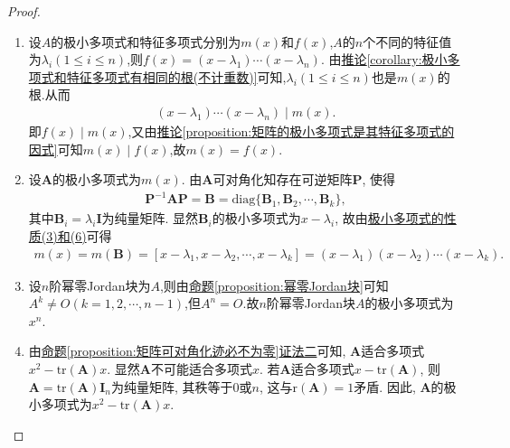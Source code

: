\documentclass[../../main.tex]{subfiles}
\begin{document}
\begin{proof}
\begin{enumerate}[(1)]
\item 设$A$的极小多项式和特征多项式分别为$m(x)$和$f(x)$,$A$的$n$个不同的特征值为$\lambda_i(1\leqslant  i\leqslant  n)$,则$f(x)=(x-\lambda_1)\cdots(x-\lambda_n)$.
由\hyperref[corollary:极小多项式和特征多项式有相同的根(不计重数)]{推论\ref{corollary:极小多项式和特征多项式有相同的根(不计重数)}}可知,$\lambda_i(1\leqslant  i\leqslant  n)$也是$m(x)$的根.从而
\begin{align*}
(x-\lambda_1)\cdots(x-\lambda_n)\mid m(x).
\end{align*}
即$f(x)\mid m(x)$,又由\hyperref[proposition:矩阵的极小多项式是其特征多项式的因式]{推论\ref{proposition:矩阵的极小多项式是其特征多项式的因式}}可知$m(x)\mid f(x)$,故$m(x)=f(x)$.

\item 设\(\boldsymbol{A}\)的极小多项式为\(m(x)\). 由\(\boldsymbol{A}\)可对角化知存在可逆矩阵\(\boldsymbol{P}\), 使得
\begin{align*}
\boldsymbol{P}^{-1}\boldsymbol{A}\boldsymbol{P} = \boldsymbol{B} = \mathrm{diag}\{\boldsymbol{B}_1,\boldsymbol{B}_2,\cdots,\boldsymbol{B}_k\},
\end{align*}
其中\(\boldsymbol{B}_i = \lambda_i\boldsymbol{I}\)为纯量矩阵. 显然\(\boldsymbol{B}_i\)的极小多项式为\(x - \lambda_i\), 故由\hyperref[proposition:极小多项式的性质]{极小多项式的性质(3)和(6)}可得
\begin{align*}
m(x) = m(\boldsymbol{B})= [x - \lambda_1,x - \lambda_2,\cdots,x - \lambda_k] = (x - \lambda_1)(x - \lambda_2)\cdots(x - \lambda_k). 
\end{align*} 

\item 设\(n\)阶幂零Jordan块为$A$,则由\hyperref[proposition:幂零Jordan块]{命题\ref{proposition:幂零Jordan块}}可知$A^k\ne O(k=1,2,\cdots,n-1)$,但$A^n=O$.故\(n\)阶幂零Jordan块$A$的极小多项式为$x^n$.

\item 由\hyperref[proposition:矩阵可对角化迹必不为零]{命题\ref{proposition:矩阵可对角化迹必不为零}证法二}可知, \(\boldsymbol{A}\)适合多项式\(x^2 - \mathrm{tr}(\boldsymbol{A})x\). 显然\(\boldsymbol{A}\)不可能适合多项式\(x\). 若\(\boldsymbol{A}\)适合多项式\(x - \mathrm{tr}(\boldsymbol{A})\), 则\(\boldsymbol{A} = \mathrm{tr}(\boldsymbol{A})\boldsymbol{I}_n\)为纯量矩阵, 其秩等于\(0\)或\(n\), 这与\(\mathrm{r}(\boldsymbol{A}) = 1\)矛盾. 因此, \(\boldsymbol{A}\)的极小多项式为\(x^2 - \mathrm{tr}(\boldsymbol{A})x\). 
\end{enumerate}
\end{proof}
\end{document}
